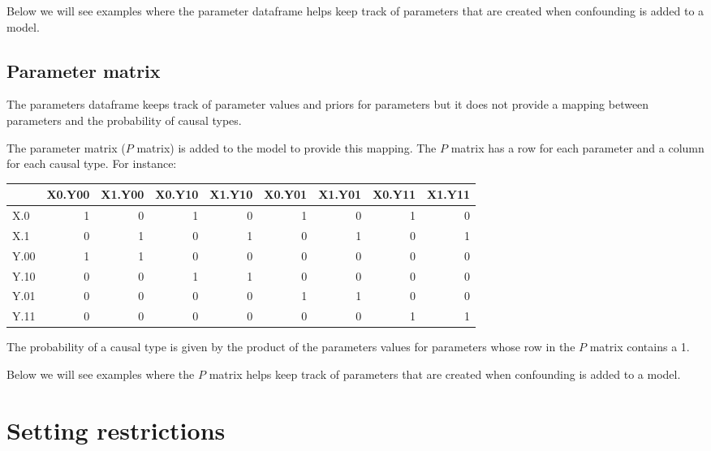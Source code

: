 \documentclass[
  12pt,
]{book}
\newenvironment{Shaded}{\begin{snugshade}}{\end{snugshade}}
\newcommand{\KeywordTok}[1]{\textcolor[rgb]{0.13,0.29,0.53}{\textbf{#1}}}
\newcommand{\NormalTok}[1]{#1}
\newcommand{\OperatorTok}[1]{\textcolor[rgb]{0.81,0.36,0.00}{\textbf{#1}}}
\newcommand{\StringTok}[1]{\textcolor[rgb]{0.31,0.60,0.02}{#1}}
\begin{document}
Below we will see examples where the parameter dataframe helps keep track of parameters that are created when confounding is added to a model.

\hypertarget{parameter-matrix}{%
\subsection{Parameter matrix}\label{parameter-matrix}}

The parameters dataframe keeps track of parameter values and priors for parameters but it does not provide a mapping between parameters and the probability of causal types.

The parameter matrix (\(P\) matrix) is added to the model to provide this mapping. The \(P\) matrix has a row for each parameter and a column for each causal type. For instance:

\begin{Shaded}
\end{Shaded}

\begin{tabular}{l|r|r|r|r|r|r|r|r}
\hline
  & X0.Y00 & X1.Y00 & X0.Y10 & X1.Y10 & X0.Y01 & X1.Y01 & X0.Y11 & X1.Y11\\
\hline
X.0 & 1 & 0 & 1 & 0 & 1 & 0 & 1 & 0\\
\hline
X.1 & 0 & 1 & 0 & 1 & 0 & 1 & 0 & 1\\
\hline
Y.00 & 1 & 1 & 0 & 0 & 0 & 0 & 0 & 0\\
\hline
Y.10 & 0 & 0 & 1 & 1 & 0 & 0 & 0 & 0\\
\hline
Y.01 & 0 & 0 & 0 & 0 & 1 & 1 & 0 & 0\\
\hline
Y.11 & 0 & 0 & 0 & 0 & 0 & 0 & 1 & 1\\
\hline
\end{tabular}

The probability of a causal type is given by the product of the parameters values for parameters whose row in the \(P\) matrix contains a 1.

Below we will see examples where the \(P\) matrix helps keep track of parameters that are created when confounding is added to a model.

\hypertarget{restrictions}{%
\section{Setting restrictions}\label{restrictions}}
\end{document}
